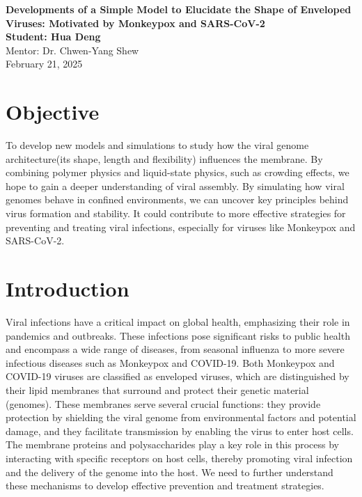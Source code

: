 \documentclass[12pt]{article}
\begin{document}
\doublespacing

\begin{center}
{\Large \textbf{Developments of a Simple Model to Elucidate the Shape of Enveloped Viruses: Motivated by Monkeypox and SARS-CoV-2}}\\[1.5ex]
{\normalsize \textbf {Student: Hua Deng}}\\
{\normalsize Mentor: Dr. Chwen-Yang Shew}\\
{\normalsize February 21, 2025}
\end{center}





\begin{flushleft}
\setlength{\parindent}{45pt}

\section*{Objective}




To develop new models and simulations to study how the viral genome architecture(its shape, length and flexibility) influences the membrane. By combining polymer physics and liquid-state physics, such as crowding effects, we hope to gain a deeper understanding of viral assembly. By simulating how viral genomes behave in confined environments, we can uncover key principles behind virus formation and stability. It could contribute to more effective strategies for preventing and treating viral infections, especially for viruses like Monkeypox and SARS-CoV-2.
\section*{Introduction}

Viral infections have a critical impact on global health, emphasizing their role in pandemics and outbreaks. These infections pose significant risks to public health and encompass a wide range of diseases, from seasonal influenza to more severe infectious diseases such as Monkeypox and COVID-19. Both Monkeypox and COVID-19 viruses are classified as enveloped viruses, which are distinguished by their lipid membranes that surround and protect their genetic material (genomes). These membranes serve several crucial functions: they provide protection by shielding the viral genome from environmental factors and potential damage, and they facilitate transmission by enabling the virus to enter host cells. The membrane proteins and polysaccharides play a key role in this process by interacting with specific receptors on host cells, thereby promoting viral infection and the delivery of the genome into the host. We need to further understand these mechanisms to develop effective prevention and treatment strategies.


\end{flushleft}
\end{document}
